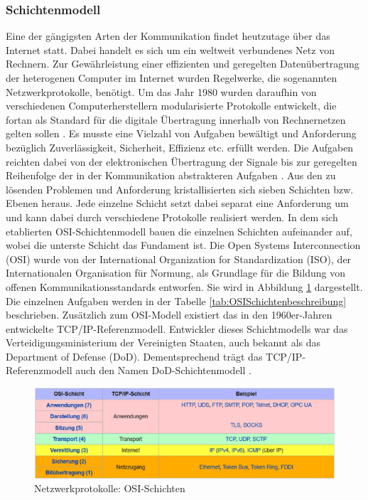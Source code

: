 \subsubsection{Schichtenmodell}
Eine der gängigsten Arten der Kommunikation findet heutzutage über das Internet statt. 
Dabei handelt es sich um ein weltweit verbundenes Netz von Rechnern. Zur Gewährleistung einer effizienten und geregelten Datenübertragung der heterogenen Computer im Internet wurden Regelwerke, die sogenannten Netzwerkprotokolle, benötigt.
Um das Jahr 1980 wurden daraufhin von verschiedenen Computerherstellern modularisierte Protokolle entwickelt, die fortan als Standard für die digitale Übertragung innerhalb von Rechnernetzen gelten sollen \cite{wikiNetzwerkprotokolle}.
Es musste eine Vielzahl von Aufgaben bewältigt und Anforderung bezüglich Zuverlässigkeit, Sicherheit, Effizienz etc. erfüllt werden. Die Aufgaben reichten dabei von der elektronischen Übertragung der Signale bis zur geregelten Reihenfolge der in der Kommunikation abstrakteren Aufgaben \cite{wikiOsiModell}.
Aus den zu lösenden Problemen und Anforderung kristallisierten sich sieben Schichten bzw. Ebenen heraus. 
Jede einzelne Schicht setzt dabei separat eine Anforderung um und kann dabei durch verschiedene Protokolle realisiert werden. In dem sich etablierten OSI-Schichtenmodell bauen die einzelnen Schichten aufeinander auf, wobei die unterste Schicht das Fundament ist. 
Die Open Systems Interconnection (OSI) wurde von der International Organization for Standardization (ISO), der Internationalen Organisation für Normung, als Grundlage für die Bildung von offenen Kommunikationsstandards entworfen. Sie wird in Abbildung \ref{fig:OSISchichten} dargestellt. Die einzelnen Aufgaben werden in der Tabelle \ref{tab:OSISchichtenbeschreibung} beschrieben.
\newline
\noindent
Zusätzlich zum OSI-Modell existiert das in den 1960er-Jahren entwickelte TCP/IP-Referenz\-modell. Entwickler dieses Schichtmodells war das Verteidigungsministerium der Vereinigten Staaten, auch bekannt als das Department of Defense (DoD). Dementsprechend trägt das TCP/IP-Referenzmodell auch den Namen DoD-Schichtenmodell \cite{wikiDodModell}.

\begin{figure}[tbt]
\centering
\includegraphics[width=\textwidth]{images/Netzwerkprotokolle_OSI-Schicht.PNG}
\caption[Netzwerkprotokolle: OSI-Schichten]{Netzwerkprotokolle: OSI-Schichten \protect \footnotemark}
\label{fig:OSISchichten}
\end{figure}

